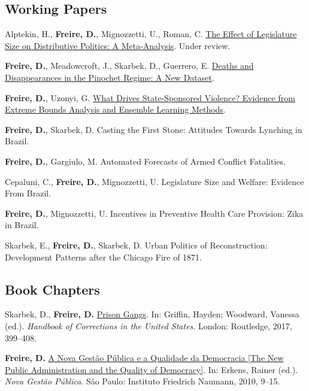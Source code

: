 \documentclass[a4paper]{article}
\renewenvironment{itemize}{
	\begin{list}{}{
			\setlength{\leftmargin}{1.5em}
		}
		}{
	\end{list}
}
\begin{document}
\subsection*{Working Papers}

\begin{itemize}
\item Alptekin, H., \textbf{Freire, D.}, Mignozzetti, U., Roman, C. \href{https://doi.org/10.31235/osf.io/xf7wp}{The Effect of Legislature Size on Distributive Politics: A Meta-Analysis}. Under review.
\item \textbf{Freire, D.}, Meadowcroft, J., Skarbek, D., Guerrero, E. \href{https://osf.io/vqnwu}{Deaths and Disappearances in the Pinochet Regime: A New Dataset}.
\item \textbf{Freire, D.}, Uzonyi, G. \href{https://osf.io/pzx3q}{What Drives State-Sponsored Violence? Evidence from Extreme Bounds Analysis and Ensemble Learning Methods}.
\item \textbf{Freire, D.}, Skarbek, D. Casting the First Stone: Attitudes Towards Lynching in Brazil.
\item \textbf{Freire, D.}, Gargiulo, M. Automated Forecasts of Armed Conflict Fatalities.
\item Cepaluni, C., \textbf{Freire, D.}, Mignozzetti, U. Legislature Size and Welfare: Evidence From Brazil. 
\item \textbf{Freire, D.}, Mignozzetti, U. Incentives in Preventive Health Care Provision: Zika in Brazil.
\item Skarbek, E., \textbf{Freire, D.}, Skarbek, D. Urban Politics of Reconstruction: Development Patterns after the Chicago Fire of 1871.
\end{itemize}

\subsection*{Book Chapters}

\begin{itemize}
\item Skarbek, D., \textbf{Freire, D.} \href{https://osf.io/kuqqx/}{Prison Gangs}. In: Griffin, Hayden; Woodward, Vanessa (ed.). \textit{Handbook of Corrections in the United States}. London: Routledge, 2017, 399--408.
\item \textbf{Freire, D.} \href{https://fnst.org/sites/default/files/uploads/2017/12/08/ngp.pdf}{A Nova Gest\~{a}o P\'{u}blica e a Qualidade da Democracia {[}The New Public Administration and the Quality of Democracy{]}}. In: Erkens, Rainer (ed.). \textit{Nova Gest\~{a}o P\'{u}blica}. S\~{a}o Paulo: Instituto Friedrich Naumann, 2010, 9--15.
\end{itemize}
\end{document}
